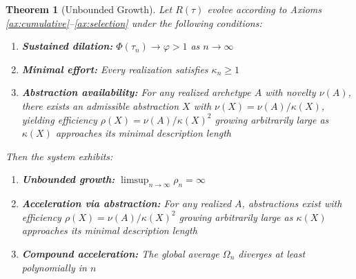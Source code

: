 \documentclass[11pt]{article}
\newtheorem{theorem}{Theorem}[section]
\theoremstyle{definition}
\theoremstyle{remark}
\begin{document}
\begin{theorem}[Unbounded Growth]
\label{thm:unbounded-growth}
Let $R(\tau)$ evolve according to Axioms \ref{ax:cumulative}--\ref{ax:selection} under the following conditions:
\begin{enumerate}[label=(\roman*)]
\item \textbf{Sustained dilation:} $\Phi(\tau_n) \to \varphi > 1$ as $n \to \infty$
\item \textbf{Minimal effort:} Every realization satisfies $\kappa_n \geq 1$
\item \textbf{Abstraction availability:} For any realized archetype $A$ with novelty $\nu(A)$, there exists an admissible abstraction $X$ with $\nu(X) = \nu(A)/\kappa(X)$, yielding efficiency $\rho(X) = \nu(A)/\kappa(X)^2$ growing arbitrarily large as $\kappa(X)$ approaches its minimal description length
\end{enumerate}
Then the system exhibits:
\begin{enumerate}
\item \textbf{Unbounded growth:} $\limsup_{n \to \infty} \rho_n = \infty$
\item \textbf{Acceleration via abstraction:} For any realized $A$, abstractions exist with efficiency $\rho(X) = \nu(A)/\kappa(X)^2$ growing arbitrarily large as $\kappa(X)$ approaches its minimal description length
\item \textbf{Compound acceleration:} The global average $\Omega_n$ diverges at least polynomially in $n$
\end{enumerate}
\end{theorem}
\end{document}

